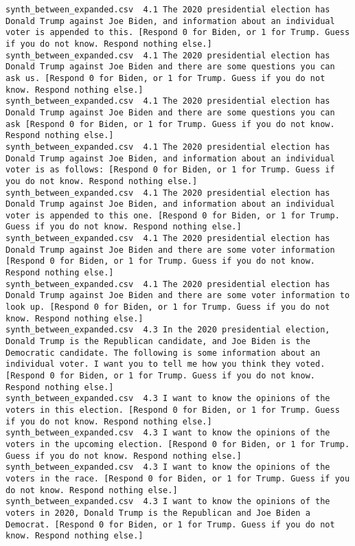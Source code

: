 \begin{lstlisting}[label=lst:promptvariants]
synth_between_expanded.csv	4.1	The 2020 presidential election has Donald Trump against Joe Biden, and information about an individual voter is appended to this. [Respond 0 for Biden, or 1 for Trump. Guess if you do not know. Respond nothing else.]
synth_between_expanded.csv	4.1	The 2020 presidential election has Donald Trump against Joe Biden and there are some questions you can ask us. [Respond 0 for Biden, or 1 for Trump. Guess if you do not know. Respond nothing else.]
synth_between_expanded.csv	4.1	The 2020 presidential election has Donald Trump against Joe Biden and there are some questions you can ask [Respond 0 for Biden, or 1 for Trump. Guess if you do not know. Respond nothing else.]
synth_between_expanded.csv	4.1	The 2020 presidential election has Donald Trump against Joe Biden, and information about an individual voter is as follows: [Respond 0 for Biden, or 1 for Trump. Guess if you do not know. Respond nothing else.]
synth_between_expanded.csv	4.1	The 2020 presidential election has Donald Trump against Joe Biden, and information about an individual voter is appended to this one. [Respond 0 for Biden, or 1 for Trump. Guess if you do not know. Respond nothing else.]
synth_between_expanded.csv	4.1	The 2020 presidential election has Donald Trump against Joe Biden and there are some voter information [Respond 0 for Biden, or 1 for Trump. Guess if you do not know. Respond nothing else.]
synth_between_expanded.csv	4.1	The 2020 presidential election has Donald Trump against Joe Biden and there are some voter information to look up. [Respond 0 for Biden, or 1 for Trump. Guess if you do not know. Respond nothing else.]
synth_between_expanded.csv	4.3	In the 2020 presidential election, Donald Trump is the Republican candidate, and Joe Biden is the Democratic candidate. The following is some information about an individual voter. I want you to tell me how you think they voted. [Respond 0 for Biden, or 1 for Trump. Guess if you do not know. Respond nothing else.]
synth_between_expanded.csv	4.3	I want to know the opinions of the voters in this election. [Respond 0 for Biden, or 1 for Trump. Guess if you do not know. Respond nothing else.]
synth_between_expanded.csv	4.3	I want to know the opinions of the voters in the upcoming election. [Respond 0 for Biden, or 1 for Trump. Guess if you do not know. Respond nothing else.]
synth_between_expanded.csv	4.3	I want to know the opinions of the voters in the race. [Respond 0 for Biden, or 1 for Trump. Guess if you do not know. Respond nothing else.]
synth_between_expanded.csv	4.3	I want to know the opinions of the voters in 2020, Donald Trump is the Republican and Joe Biden a Democrat. [Respond 0 for Biden, or 1 for Trump. Guess if you do not know. Respond nothing else.]

\end{lstlisting}
